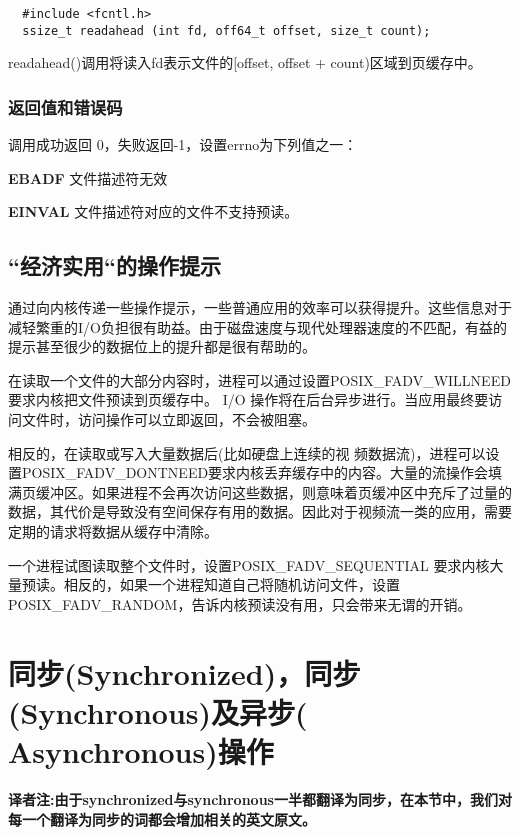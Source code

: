 \begin{lstlisting}
  #include <fcntl.h>
  ssize_t readahead (int fd, off64_t offset, size_t count);
\end{lstlisting}

readahead()调用将读入fd表示文件的[offset, offset + count)区域到页缓存中。

\subsubsection{返回值和错误码}

调用成功返回 0，失败返回-1，设置errno为下列值之一：

\begin{eqlist*}
\item[\textbf{EBADF}] 文件描述符无效
\item[\textbf{EINVAL}] 文件描述符对应的文件不支持预读。
\end{eqlist*}

\subsection{“经济实用“的操作提示}

通过向内核传递一些操作提示，一些普通应用的效率可以获得提升。这些信息对于减轻繁重的I/O负担很有助益。由于磁盘速度与现代处理器速度的不匹配，有益的提示甚至很少的数据位上的提升都是很有帮助的。

在读取一个文件的大部分内容时，进程可以通过设置POSIX\_FADV\_WILLNEED 要求内核把文件预读到页缓存中。 I/O 操作将在后台异步进行。当应用最终要访问文件时，访问操作可以立即返回，不会被阻塞。

相反的，在读取或写入大量数据后(比如硬盘上连续的视 频数据流)，进程可以设置POSIX\_FADV\_DONTNEED要求内核丢弃缓存中的内容。大量的流操作会填满页缓冲区。如果进程不会再次访问这些数据，则意味着页缓冲区中充斥了过量的数据，其代价是导致没有空间保存有用的数据。因此对于视频流一类的应用，需要定期的请求将数据从缓存中清除。

一个进程试图读取整个文件时，设置POSIX\_FADV\_SEQUENTIAL 要求内核大量预读。相反的，如果一个进程知道自己将随机访问文件，设置POSIX\_FADV\_RANDOM，告诉内核预读没有用，只会带来无谓的开销。

\section{同步(Synchronized)，同步(Synchronous)及异步( Asynchronous)操作}

\textbf{译者注:由于synchronized与synchronous一半都翻译为同步，在本节中，我们对每一个翻译为同步的词都会增加相关的英文原文。}

